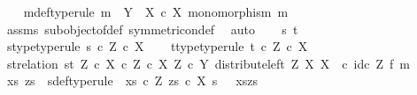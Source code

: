 \begin{isabellebody}
\isamarkupfalse%
\isanewline
\ \ \isamarkupfalse%
\ m{\isacharunderscore}{\kern0pt}def{\isacharbrackleft}{\kern0pt}type{\isacharunderscore}{\kern0pt}rule{\isacharbrackright}{\kern0pt}{\isacharcolon}{\kern0pt}\ {\isachardoublequoteopen}m\ {\isacharcolon}{\kern0pt}\ Y\ {\isasymrightarrow}\ X\ {\isasymtimes}\isactrlsub c\ X{\isachardoublequoteclose}\ {\isachardoublequoteopen}monomorphism\ m{\isachardoublequoteclose}\isanewline
\ \ \ \ \isamarkupfalse%
\ assms\ subobject{\isacharunderscore}{\kern0pt}of{\isacharunderscore}{\kern0pt}def{}\ symmetric{\isacharunderscore}{\kern0pt}on{\isacharunderscore}{\kern0pt}def\ \isamarkupfalse%
\ auto\isanewline
\isanewline
\ \ \isamarkupfalse%
\ s\ t\ \isanewline
\ \ \isamarkupfalse%
\ s{\isacharunderscore}{\kern0pt}type{\isacharbrackleft}{\kern0pt}type{\isacharunderscore}{\kern0pt}rule{\isacharbrackright}{\kern0pt}{\isacharcolon}{\kern0pt}\ {\isachardoublequoteopen}s\ {\isasymin}\isactrlsub c\ Z\ {\isasymtimes}\isactrlsub c\ X{\isachardoublequoteclose}\isanewline
\ \ \isamarkupfalse%
\ t{\isacharunderscore}{\kern0pt}type{\isacharbrackleft}{\kern0pt}type{\isacharunderscore}{\kern0pt}rule{\isacharbrackright}{\kern0pt}{\isacharcolon}{\kern0pt}\ {\isachardoublequoteopen}t\ {\isasymin}\isactrlsub c\ Z\ {\isasymtimes}\isactrlsub c\ X{\isachardoublequoteclose}\isanewline
\ \ \isamarkupfalse%
\ st{\isacharunderscore}{\kern0pt}relation{\isacharcolon}{\kern0pt}\ {\isachardoublequoteopen}{\isasymlangle}s{\isacharcomma}{\kern0pt}t{\isasymrangle}\ {\isasymin}\isactrlbsub {\isacharparenleft}{\kern0pt}Z\ {\isasymtimes}\isactrlsub c\ X{\isacharparenright}{\kern0pt}\ {\isasymtimes}\isactrlsub c\ Z\ {\isasymtimes}\isactrlsub c\ X\isactrlesub \ {\isacharparenleft}{\kern0pt}Z\ {\isasymtimes}\isactrlsub c\ Y{\isacharcomma}{\kern0pt}\ distribute{\isacharunderscore}{\kern0pt}left\ Z\ X\ X\ \ {\isasymcirc}\isactrlsub c\ {\isacharparenleft}{\kern0pt}id\isactrlsub c\ Z\ {\isasymtimes}\isactrlsub f\ m{\isacharparenright}{\kern0pt}{\isacharparenright}{\kern0pt}{\isachardoublequoteclose}\isanewline
\ \ \isanewline
\ \ \isamarkupfalse%
\ xs\ zs\ \ s{\isacharunderscore}{\kern0pt}def{\isacharbrackleft}{\kern0pt}type{\isacharunderscore}{\kern0pt}rule{\isacharbrackright}{\kern0pt}{\isacharcolon}{\kern0pt}\ {\isachardoublequoteopen}\ xs\ {\isasymin}\isactrlsub c\ Z{\isachardoublequoteclose}\ {\isachardoublequoteopen}zs\ {\isasymin}\isactrlsub c\ X{\isachardoublequoteclose}\ {\isachardoublequoteopen}s\ {\isacharequal}{\kern0pt}\ \ {\isasymlangle}xs{\isacharcomma}{\kern0pt}zs{\isasymrangle}{\isachardoublequoteclose}\isanewline

\end{isabellebody}
